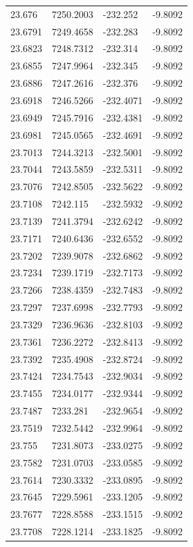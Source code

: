 \begin{table}[H]
\begin{tabular}{llll}
23.676 & 7250.2003 & -232.252 & -9.8092 \\
23.6791 & 7249.4658 & -232.283 & -9.8092 \\
23.6823 & 7248.7312 & -232.314 & -9.8092 \\
23.6855 & 7247.9964 & -232.345 & -9.8092 \\
23.6886 & 7247.2616 & -232.376 & -9.8092 \\
23.6918 & 7246.5266 & -232.4071 & -9.8092 \\
23.6949 & 7245.7916 & -232.4381 & -9.8092 \\
23.6981 & 7245.0565 & -232.4691 & -9.8092 \\
23.7013 & 7244.3213 & -232.5001 & -9.8092 \\
23.7044 & 7243.5859 & -232.5311 & -9.8092 \\
23.7076 & 7242.8505 & -232.5622 & -9.8092 \\
23.7108 & 7242.115 & -232.5932 & -9.8092 \\
23.7139 & 7241.3794 & -232.6242 & -9.8092 \\
23.7171 & 7240.6436 & -232.6552 & -9.8092 \\
23.7202 & 7239.9078 & -232.6862 & -9.8092 \\
23.7234 & 7239.1719 & -232.7173 & -9.8092 \\
23.7266 & 7238.4359 & -232.7483 & -9.8092 \\
23.7297 & 7237.6998 & -232.7793 & -9.8092 \\
23.7329 & 7236.9636 & -232.8103 & -9.8092 \\
23.7361 & 7236.2272 & -232.8413 & -9.8092 \\
23.7392 & 7235.4908 & -232.8724 & -9.8092 \\
23.7424 & 7234.7543 & -232.9034 & -9.8092 \\
23.7455 & 7234.0177 & -232.9344 & -9.8092 \\
23.7487 & 7233.281 & -232.9654 & -9.8092 \\
23.7519 & 7232.5442 & -232.9964 & -9.8092 \\
23.755 & 7231.8073 & -233.0275 & -9.8092 \\
23.7582 & 7231.0703 & -233.0585 & -9.8092 \\
23.7614 & 7230.3332 & -233.0895 & -9.8092 \\
23.7645 & 7229.5961 & -233.1205 & -9.8092 \\
23.7677 & 7228.8588 & -233.1515 & -9.8092 \\
23.7708 & 7228.1214 & -233.1825 & -9.8092 \\

\end{tabular}
\end{table}
